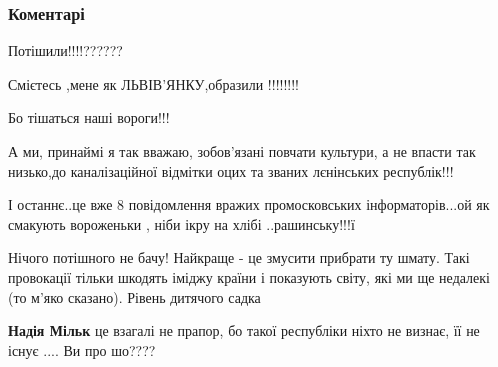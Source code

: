  
 
 
 
 
\subsubsection{Коментарі}
\label{sec:08_08_2021.fb.lviv1256.1.flag_dnr_lvov.cmt}

\begin{itemize}
 

Потішили!!!!??????

Смієтесь ,мене як ЛЬВІВ'ЯНКУ,образили !!!!!!!!

Бо тішаться наші вороги!!!

А ми, принаймі я так вважаю, зобов'язані повчати культури, а не впасти так
низько,до каналізаційної відмітки оцих та званих лєнінських республік!!!

І останнє..це вже 8 повідомлення вражих промосковських інформаторів...ой як
смакують вороженьки , ніби ікру на хлібі ..рашинську!!!ї



 

Нічого потішного не бачу! Найкраще - це змусити прибрати ту шмату. Такі
провокації тільки шкодять іміджу країни і показують світу, які ми ще недалекі
(то м'яко сказано). Рівень дитячого садка

\begin{itemize}
 
\textbf{Надія Мільк} це взагалі не прапор, бо такої республіки ніхто не визнає, її не існує .... Ви про шо????


\end{itemize}
\end{itemize}
